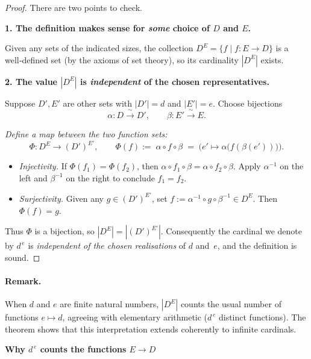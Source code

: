\documentclass[12pt]{article}
\theoremstyle{definition} %
\theoremstyle{plain} %
\begin{document}
      \begin{proof}
      There are two points to check.
      
      \medskip
      \noindent\textbf{1.  The definition makes sense for \emph{some}
         choice of $D$ and $E$.}
      
      Given any sets of the indicated sizes, the collection
      $D^{E}=\{f\mid f:E\to D\}$ is a well‑defined set
      (by the axioms of set theory), so its cardinality $|D^{E}|$ exists.
      
      \medskip
      \noindent\textbf{2.  The value $|D^{E}|$ is \emph{independent}
         of the chosen representatives.}
      
      Suppose $D',E'$ are other sets with $|D'|=d$ and $|E'|=e$.
      Choose bijections
      \[
        \alpha\colon D\xrightarrow{\;\sim\;} D',
        \qquad
        \beta\colon E'\xrightarrow{\;\sim\;} E.
      \]
      
      \smallskip
      \emph{Define a map between the two function sets:}
      \[
        \Phi\colon D^{E}\longrightarrow (D')^{E'},
        \qquad
        \Phi(f)
            :=\;
            \alpha\circ f\circ \beta
            \;=\;
            \bigl(e'\mapsto \alpha\bigl(f(\beta(e'))\bigr)\bigr).
      \]
      
      \smallskip
      \begin{itemize}
        \item \emph{Injectivity.}
              If $\Phi(f_1)=\Phi(f_2)$, then
              $\alpha\circ f_1\circ\beta=\alpha\circ f_2\circ\beta$.
              Apply $\alpha^{-1}$ on the left and $\beta^{-1}$ on the right
              to conclude $f_1=f_2$.
        \item \emph{Surjectivity.}
              Given any $g\in (D')^{E'}$, set
              $f:=\alpha^{-1}\circ g\circ \beta^{-1}\in D^{E}$.
              Then $\Phi(f)=g$.
      \end{itemize}
      
      Thus $\Phi$ is a bijection,
      so $|D^{E}| = |(D')^{E'}|$.
      Consequently the cardinal we denote by $d^{\,e}$ is
      \emph{independent of the chosen realisations} of $d$ and~$e$,
      and the definition is sound.
      \end{proof}
      
      \paragraph{Remark.}
      When $d$ and $e$ are finite natural numbers,
      $|D^{E}|$ counts the usual number of functions
      $e\mapsto d$, agreeing with elementary arithmetic
      ($d^{\,e}$ distinct functions).
      The theorem shows that this interpretation extends coherently
      to infinite cardinals.
\begin{center}
  \textbf{Why \(\displaystyle d^{\,e}\) counts the functions \(E\to D\)}
  \end{center}
  
\end{document}
